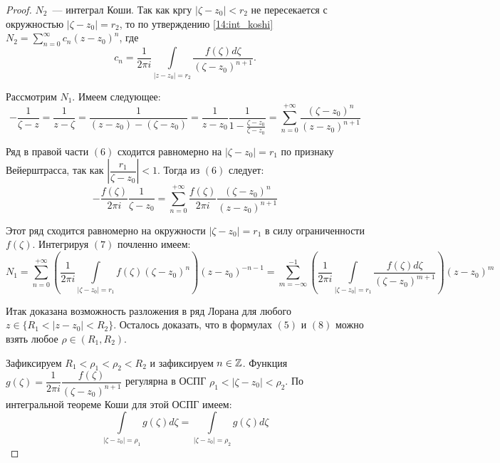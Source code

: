 \begin{proof}
\begin{minipage}[c]{0.67\textwidth}
        \(N_2\)~--- интеграл Коши. Так как кргу \(|\zeta - z_0| < r_2\) не пересекается с
        окружностью \(|\zeta - z_0| = r_2\), то по утверждению \ref{14:int_koshi} \(N_2 =
        \sum\limits_{n = 0}^\infty c_n (z-z_0)^n\), где
        \[
        c_n = \dfrac{1}{2 \pi i} \int\limits_{|z - z_0| = r_2} \dfrac{f(\zeta) d\zeta}{(\zeta - z_0)
         ^ {n+1}}. \tag{5}
        \]
    \end{minipage}

    Рассмотрим \(N_1\). Имеем следующее:
    \[
    - \dfrac{1}{\zeta - z} = \dfrac{1}{z - \zeta} = \dfrac{1}{(z-z_0) - (\zeta - z_0)} =
    \dfrac{1}{z-z_0} \dfrac{1}{1 - \frac{\zeta - z_0}{\zeta - z_0}} = \sum\limits_{n=0}^{+\infty}
    \dfrac{(\zeta - z_0)^n}{(z - z_0)^{n+1}} \tag{6}
    \]

    Ряд в правой части \((6)\) сходится равномерно на \(|\zeta - z_0| = r_1\) по признаку
    Вейерштрасса, так как \(\left|\dfrac{r_1}{\zeta - z_0}\right| < 1\). Тогда из \((6)\) следует:
    \[
    - \dfrac{f(\zeta)}{2 \pi i} \dfrac{1}{\zeta - z_0} = \sum\limits_{n=0}^{+\infty}
    \dfrac{f(\zeta)}{2 \pi i} \dfrac{(\zeta - z_0)^n}{(z - z_0)^{n+1}} \tag{7}
    \]

    Этот ряд сходится равномерно на окружности \(|\zeta - z_0| = r_1\) в силу ограниченности
    \(f(\zeta)\). Интегрируя \((7)\) почленно имеем:
    \[
    N_1 = \sum\limits_{n=0}^{+\infty} (\dfrac{1}{2 \pi i}\int\limits_{|\zeta - z_0| = r_1}
    f(\zeta) (\zeta - z_0)^n) (z-z_0)^{-n-1} = \sum\limits_{m = - \infty} ^ {-1} (\dfrac{1}{2 \pi i}
    \int\limits_{|\zeta - z_0| = r_1} \dfrac{f(\zeta) d\zeta}{(\zeta - z_0)^{m+1}}) (z-z_0)^m
    \tag{8}
    \]

    Итак доказана возможность разложения в ряд Лорана для любого \(z \in \{R_1 < |z-z_0| < R_2\}\).
    Осталось доказать, что в формулах \((5)\) и \((8)\) можно взять любое \(\rho \in (R_1, R_2)\).

    Зафиксируем \(R_1 < \rho_1 < \rho_2 < R_2\) и зафиксируем \(n \in \mathbb{Z}\). Функция \(g(\zeta) =
    \dfrac{1}{2 \pi i} \dfrac{f(\zeta)}{(\zeta - z_0)^{n+1}}\) регулярна в ОСПГ \(\rho_1 < |\zeta -
    z_0| < \rho_2\). По интегральной теореме Коши для этой ОСПГ имеем:
    \[
    \int\limits_{|\zeta - z_0| = \rho_1} g(\zeta) d\zeta = \int\limits_{|\zeta - z_0| = \rho_2}
    g(\zeta) d\zeta
    \]


\end{proof}
